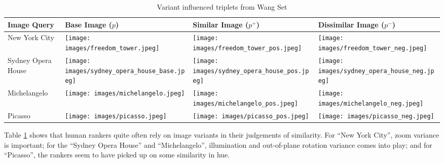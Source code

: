 \begin{table}
	\begin{tabular}{>{\centering\arraybackslash}m{1in} >{\centering\arraybackslash}m{1.4in} >{\centering\arraybackslash}m{1.4in} >{\centering\arraybackslash}m{1.4in}}
		\toprule
		\bfseries Image Query & \bfseries Base Image ($p$) & \bfseries Similar Image ($p^+$) & \bfseries Dissimilar Image ($p^-$) \\
		\midrule
		\centering New York City & \texttt{[image: images/freedom\_tower.jpeg]} & \texttt{[image: images/freedom\_tower\_pos.jpeg]} & \texttt{[image: images/freedom\_tower\_neg.jpeg]}\\
		Sydney Opera House & \texttt{[image: images/sydney\_opera\_house\_base.jpeg]} & \texttt{[image: images/sydney\_opera\_house\_pos.jpeg]} & \texttt{[image: images/sydney\_opera\_house\_neg.jpeg]}\\
		Michelangelo & \texttt{[image: images/michelangelo.jpeg]} & \texttt{[image: images/michelangelo\_pos.jpeg]} & \texttt{[image: images/michelangelo\_neg.jpeg]}\\
		Picasso & \texttt{[image: images/picasso.jpeg]} & \texttt{[image: images/picasso\_pos.jpeg]} & \texttt{[image: images/picasso\_neg.jpeg]}\\
		\bottomrule
	\end{tabular}
	\caption{Variant influenced triplets from Wang Set}
	\label{table:variant_triplets}
\end{table}

Table \ref{table:variant_triplets} shows that human rankers quite often rely on image variants in their judgements of similarity. For ``New York City'', zoom variance is important; for the ``Sydney Opera House'' and ``Michelangelo'', illumination and out-of-plane rotation variance comes into play; and for ``Picasso'', the rankers seem to have picked up on some similarity in hue.


